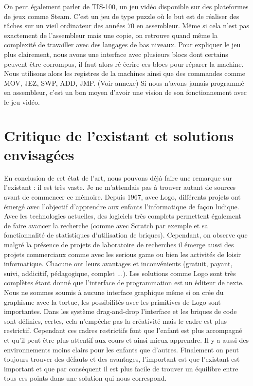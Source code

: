 On peut également parler de TIS-100, un jeu vidéo disponible sur des plateformes de jeux comme Steam. C'est un jeu de type puzzle où le but est de réaliser des tâches sur un vieil ordinateur des années 70 en assembleur. Même si cela n'est pas exactement de l'assembleur mais une copie, on retrouve quand même la complexité de travailler avec des langages de bas niveaux. Pour expliquer le jeu plus clairement, nous avons une interface avec plusieurs blocs dont certains peuvent être corrompus, il faut alors ré-écrire ces blocs pour réparer la machine. Nous utilisons alors les registres de la machines ainsi que des commandes comme MOV, JEZ, SWP, ADD, JMP. (Voir annexe) Si nous n'avons jamais programmé en assembleur, c'est un bon moyen d'avoir une vision de son fonctionnement avec le jeu vidéo. \cite{52}

\newpage

\section{Critique de l'existant et solutions envisagées}

En conclusion de cet état de l'art, nous pouvons déjà faire une remarque sur l'existant : il est très vaste. Je ne m'attendais pas à trouver autant de sources avant de commencer ce mémoire. Depuis 1967, avec Logo, différents projets ont émergé avec l'objectif d'apprendre aux enfants l'informatique de façon ludique. Avec les technologies actuelles, des logiciels très complets permettent également de faire avancer la recherche (comme avec Scratch par exemple et sa fonctionnalité de statistiques d'utilisation de briques). Cependant, on observe que malgré la présence de projets de laboratoire de recherches il émerge aussi des projets commerciaux comme avec les serious game ou bien les activités de loisir informatique. Chacune ont leurs avantages et inconvénients (gratuit, payant, suivi, addicitif, pédagogique, complet ...). Les solutions comme Logo sont très complètes étant donné que l'interface de programmation est un éditeur de texte. Nous ne sommes soumis à aucune interface graphique même si on crée du graphisme avec la tortue, les possibilités avec les primitives de Logo sont importantes. Dans les système drag-and-drop l'interface et les briques de code sont définies, certes,  cela n'empêche pas la créativité mais le cadre est plus restrictif. Cependant ces cadres restrictifs font que l'enfant est plus accompagné et qu'il peut être plus attentif aux cours et ainsi mieux apprendre. Il y a aussi des environnements moins clairs pour les enfants que d'autres. Finalement on peut toujours trouver des défauts et des avantages, l'important est que l'existant est important et que par conséquent il est plus facile de trouver un équilibre entre tous ces points dans une solution qui nous correspond.

